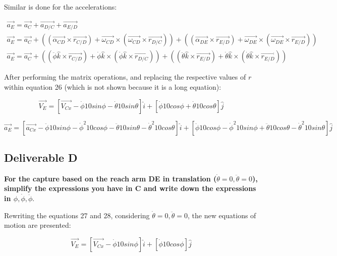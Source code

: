 \documentclass[12pt, a4paper]{article}
\begin{document}
Similar is done for the accelerations: 

\begin{align}
    \vec{a_E} = \vec{a_C} + \vec{a_{D/C}} + \vec{a_{E/D}} \\ 
    \vec{a_E} = \vec{a_C} + ((\vec{\alpha_{CD}} \times \vec{r_{C/D}}) + \vec{\omega_{CD}}\times(\vec{\omega_{CD}} \times \vec{r_{D/C}})) + ((\vec{\alpha_{DE}} \times \vec{r_{E/D}}) + \vec{\omega_{DE}}\times(\vec{\omega_{DE}} \times \vec{r_{E/D}})) \\
    \vec{a_E} = \vec{a_C} + ((\ddot\phi\hat{k} \times \vec{r_{C/D}}) + \dot\phi\hat{k} \times(\dot\phi\hat{k} \times \vec{r_{D/C}})) + ((\ddot\theta\hat{k} \times \vec{r_{E/D}}) + \dot\theta\hat{k} \times(\dot\theta\hat{k} \times \vec{r_{E/D}}))
\end{align}

After performing the matrix operations, and replacing the respective values of $r$ within equation 26 (which is not shown because it is a long equation):

\begin{equation}
    \vec{V_E} = [\vec{V_{Cx}}-\dot\phi10sin\phi-\dot\theta10sin\theta]\hat{i} + [\dot\phi10cos\phi + \dot\theta10cos\theta]\hat{j}
\end{equation}

\begin{equation}
    \vec{a_E} = [\vec{a_{Cx}}-\ddot\phi 10sin\phi - \dot\phi^2 10cos\phi - \ddot\theta 10sin\theta - \dot\theta^2 10cos\theta]\hat{i} + [\ddot\phi 10cos\phi - \dot\phi^2 10sin\phi + \ddot\theta 10cos\theta - \dot\theta^2 10sin\theta]\hat{j}
\end{equation}

\newpage
\subsection{Deliverable D}

\textbf{For the capture based on the reach arm DE in translation ($\dot\theta=0, \ddot\theta=0$), simplify the expressions you have in C and write down the expressions in $\phi, \dot\phi, \ddot\phi$}. 

Rewriting the equations 27 and 28, considering $\dot\theta=0, \ddot\theta=0$, the new equations of motion are presented: 

\begin{equation}
    \vec{V_E} = [\vec{V_{Cx}}-\dot\phi10sin\phi]\hat{i} + [\dot\phi10cos\phi]\hat{j}
\end{equation}
\end{document}
